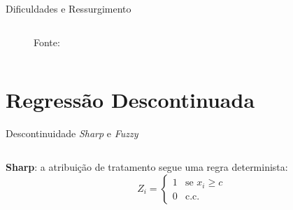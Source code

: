 \documentclass[aspectratio=1610, 10pt]{beamer}
\begin{document}
\begin{frame}{Dificuldades e Ressurgimento}
\begin{columns}[T]
\begin{column}{0.48\linewidth}
\begin{figure}
                \tiny{Fonte: \cite{cunningham2021causal}}
                \label{fig:enter-label}
            \end{figure}
        \end{column}
	\end{columns}
\end{frame}


\section{Regressão Descontinuada}

\begin{frame}{Descontinuidade \emph{Sharp} e \emph{Fuzzy}}
    \vspace{-0.4cm}
	\begin{columns}[T] %
		\begin{column}{0.48\linewidth} %
         \justifying
            \textbf{Sharp}: a atribuição de tratamento segue uma regra determinista:
            \begin{equation*}
                Z_i = \begin{cases}
                    1 & \text{se } x_i \geq c \\
                    0 & \text{c.c.}
                \end{cases}
            \end{equation*}


\end{column}
\end{columns}
\end{frame}
\end{document}
